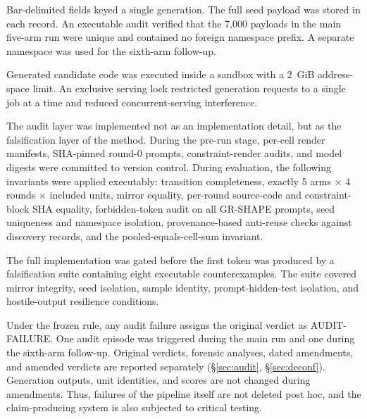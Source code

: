 \documentclass{article}
\numberwithin{equation}{section}  %
\newcommand{\fitwidth}[1]{\resizebox{\ifdim\width>\linewidth \linewidth\else\width\fi}{!}{#1}}
\theoremstyle{definition}
\newcommand{\armGR}{\textsf{GR-SHAPE}}
\begin{document}
Bar-delimited fields keyed a single generation. The full seed payload was stored in each
record. An executable audit verified that the 7{,}000 payloads in the main five-arm run were
unique and contained no foreign namespace prefix. A separate namespace was used for the
sixth-arm follow-up.

Generated candidate code was executed inside a sandbox with a 2~GiB address-space limit. An
exclusive serving lock restricted generation requests to a single job at a time and reduced
concurrent-serving interference.

The audit layer was implemented not as an implementation detail, but as the falsification
layer of the method. During the pre-run stage, per-cell render manifests, SHA-pinned round-0
prompts, constraint-render audits, and model digests were committed to version control. During
evaluation, the following invariants were applied executably: transition completeness, exactly 5 arms
$\times$ 4 rounds $\times$ included units, mirror equality, per-round source-code and
constraint-block SHA equality, forbidden-token audit on all \armGR{} prompts, seed uniqueness and
namespace isolation, provenance-based anti-reuse checks against discovery records, and the
pooled-equals-cell-sum invariant.

The full implementation was gated before the first token was produced by a falsification suite
containing eight executable counterexamples. The suite covered mirror integrity, seed
isolation, sample identity, prompt-hidden-test isolation, and hostile-output resilience
conditions.

Under the frozen rule, any audit failure assigns the original verdict as AUDIT-FAILURE. One
audit episode was triggered during the main run and one during the sixth-arm follow-up.
Original verdicts, forensic analyses, dated amendments, and amended verdicts are reported
separately (\S\ref{sec:audit}, \S\ref{sec:deconf}). Generation outputs, unit identities, and
scores are not changed during amendments. Thus, failures of the pipeline itself are not
deleted post hoc, and the claim-producing system is also subjected to critical testing.

\begin{table}[t]
\caption{Frozen experimental configuration. Decoding parameters, arm set, sample sizes, and
seed namespace were committed to version control before the main run began. The disjoint-60
sample was used only for sensitivity analysis and was not included in the primary statistical
family.}
\label{tab:config}
\centering\small
\fitwidth{}
\end{table}
\end{document}
